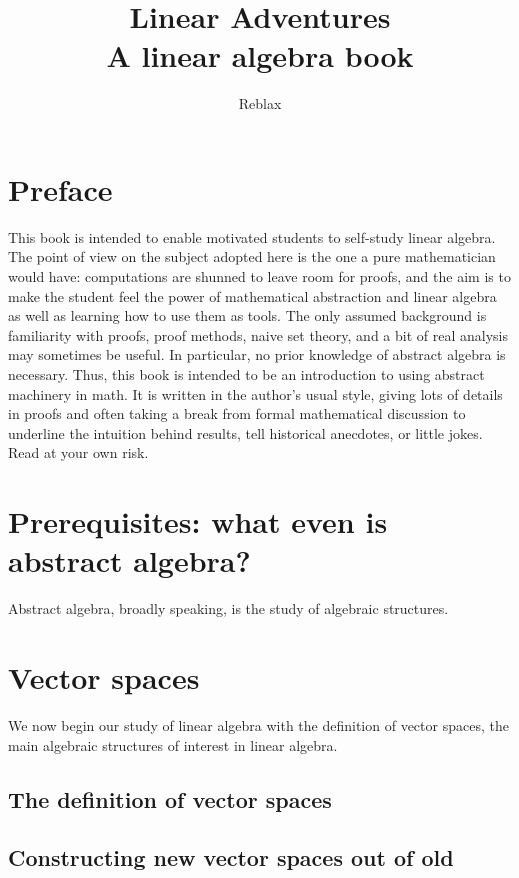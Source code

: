 \documentclass{book}
\title{Linear Adventures \\ \small A linear algebra book}
\author{Reblax}
\date{}
\theoremstyle{plain}
\theoremstyle{definition}
\theoremstyle{remark}
\begin{document}
\maketitle

\tableofcontents

\chapter*{Preface}
This book is intended to enable motivated students to self-study linear algebra. The point of view on the subject adopted here is the one a pure mathematician would have: computations are shunned to leave room for proofs, and the aim is to make the student feel the power of mathematical abstraction and linear algebra as well as learning how to use them as tools. The only assumed background is familiarity with proofs, proof methods, naive set theory, and a bit of real analysis may sometimes be useful. In particular, no prior knowledge of abstract algebra is necessary. Thus, this book is intended to be an introduction to using abstract machinery in math. It is written in the author's usual style, giving lots of details in proofs and often taking a break from formal mathematical discussion to underline the intuition behind results, tell historical anecdotes, or little jokes. Read at your own risk.

\chapter{Prerequisites: what even is abstract algebra?}

Abstract algebra, broadly speaking, is the study of algebraic structures. 

\chapter{Vector spaces}

We now begin our study of linear algebra with the definition of vector spaces, the main algebraic structures of interest in linear algebra.

\section{The definition of vector spaces}

\section{Constructing new vector spaces out of old}
\end{document}
